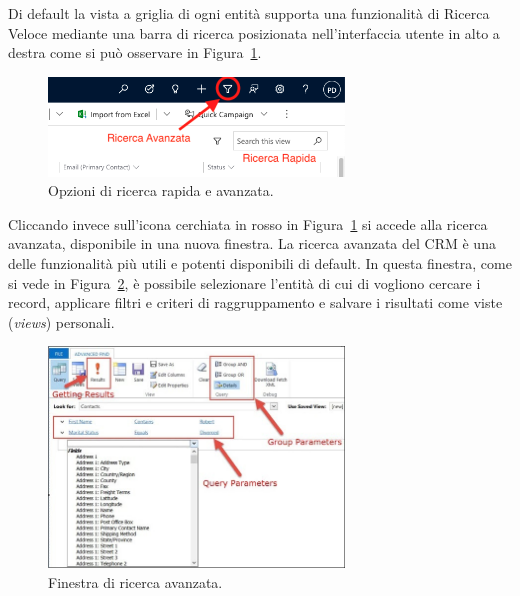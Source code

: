 Di default la vista a griglia di ogni entità supporta una funzionalità di Ricerca Veloce mediante una barra di ricerca posizionata nell'interfaccia utente in alto a destra come si può osservare in Figura~\ref{fig:quickSearch}.
\begin{figure}[ht]
  \centering
  \includegraphics[width=0.7\textwidth]{quick-search.png}
  \caption{Opzioni di ricerca rapida e avanzata.}
  \label{fig:quickSearch}
\end{figure}

Cliccando invece sull'icona cerchiata in rosso in Figura~\ref{fig:quickSearch} si accede alla ricerca avanzata, disponibile in una nuova finestra. La ricerca avanzata del CRM è una delle funzionalità più utili e potenti disponibili di default. In questa finestra, come si vede in Figura~\ref{fig:advancedSearch}, è possibile selezionare l'entità di cui di vogliono cercare i record, applicare filtri e criteri di raggruppamento e salvare i risultati come viste (\textit{views}) personali.~\cite{DynamicsTutorialspoint}
\begin{figure}[ht]
  \centering
  \includegraphics[width=0.7\textwidth]{advanced-search.png}
  \caption{Finestra di ricerca avanzata.}
  \label{fig:advancedSearch}
\end{figure}

